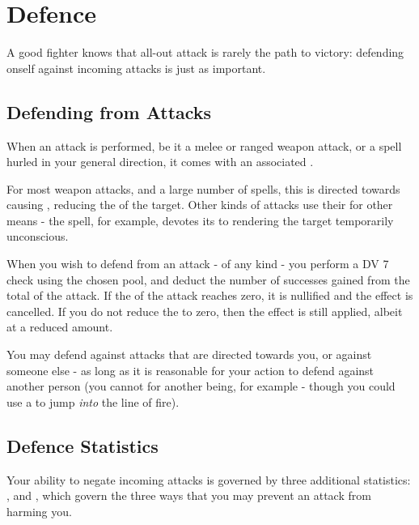 
\chapter{Defence}\label{S:Accuracy}\label{S:Defence}

A good fighter knows that all-out attack is rarely the path to victory: defending onself against incoming attacks is just as important. 

\section{Defending from Attacks}

When an attack is performed, be it a melee or ranged weapon attack, or a spell hurled in your general direction, it comes with an associated . 

For most weapon attacks, and a large number of spells, this  is directed towards causing , reducing the  of the target. Other kinds of attacks use their  for other means - the  spell, for example, devotes its  to rendering the target temporarily unconscious. 

When you wish to defend from an attack - of any kind - you perform a DV 7  check using the chosen pool, and deduct the number of successes gained from the total  of the attack. If the  of the attack reaches zero, it is nullified and the effect is cancelled. If you do not reduce the  to zero, then the effect is still applied, albeit at a reduced amount.  

You may defend against attacks that are directed towards you, or against someone else - as long as it is reasonable for your action to defend against another person (you cannot  for another being, for example - though you could use a  to jump {\it into} the line of fire).

\section{Defence Statistics}

Your ability to negate incoming attacks is governed by three additional statistics: ,  and , which govern the three ways that you may prevent an attack from harming you. 

\newcommand\defendRow[3]{\key{#1}	&	\imp{#2}	&	\parbox[t]{4.4 cm}{\raggedright #3} \\}
	
